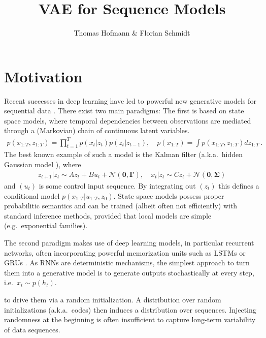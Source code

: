 \documentclass[a4paper,10pt]{article}
\title{VAE for Sequence Models}
\author{Thomas Hofmann \& Florian Schmidt}
\newcommand{\normal}{{\mathcal N}}
\begin{document}
\maketitle


\section{Motivation}

Recent successes in deep learning have led to powerful new generative models for sequential data \cite{graves2013generating}. There exist two main paradigms: The first is based on state space models, where temporal dependencies between observations are mediated through a (Markovian) chain of continuous latent variables. 
\begin{align}
p(x_{1:T}, z_{1:T}) = \prod_{t=1}^T p(x_t |z_t) p(z_t | z_{t-1}), \quad p(x_{1:T}) = \int p(x_{1:T}, z_{1:T}) dz_{1:T}\,.
\label{eq:state-space}
\end{align}
The best known example of such a model is the Kalman filter \cite{kalman1961new}  (a.k.a.~hidden Gaussian model \cite{roweis1999unifying}), where 
\begin{align}
z_{t+1}|z_t \sim A z_t + B u_t + \normal(\mathbf  0, \mathbf \Gamma), \quad 
x_t | z_t \sim C z_t + \normal(\mathbf 0, \mathbf \Sigma)
\end{align}
and $(u_t)$ is some control input sequence. By integrating out $(z_t)$ this defines a conditional model $p(x_{1:T}|u_{1:T}, z_0)$.  State space models possess proper probabilitic semantics and can be trained (albeit often not efficiently) with standard inference methods, provided that local models are simple  (e.g.~exponential families). 

The second paradigm makes use of deep learning models, in particular recurrent networks, often incorporating powerful memorization units such as LSTMs \cite{hochreiter1997long} or GRUs \cite{chung2014empirical}. As RNNs are deterministic mechanisms, the simplest approach to turn them into a generative model is to generate outputs stochastically at every step, i.e.~$x_t \sim p(h_t)$. 

\newpage



to drive them via a random initialization. A distribution over random initializations (a.k.a.~codes) then induces a distribution over sequences. Injecting randomness at the beginning is often insufficient to capture long-term variability of data sequences.

\newpage
\end{document}

